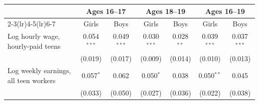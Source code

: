 \begin{tabular}{lcccccc}
\toprule
 & \multicolumn{2}{c}{Ages 16--17} & \multicolumn{2}{c}{Ages 18--19} & \multicolumn{2}{c}{Ages 16--19} \\
\cmidrule(lr){2-3}\cmidrule(lr){4-5}\cmidrule(lr){6-7}
 & Girls & Boys & Girls & Boys & Girls & Boys \\
\midrule
Log hourly wage, hourly-paid teens & 0.054$^{***}$ & 0.049$^{***}$ & 0.030$^{***}$ & 0.028$^{**}$ & 0.039$^{***}$ & 0.037$^{***}$ \\
 & (0.019) & (0.017) & (0.009) & (0.014) & (0.010) & (0.013) \\
Log weekly earnings, all teen workers & 0.057$^{*}$ & 0.062 & 0.050$^{*}$ & 0.038 & 0.050$^{**}$ & 0.045 \\
 & (0.033) & (0.050) & (0.027) & (0.036) & (0.022) & (0.038) \\
\bottomrule
\end{tabular}
